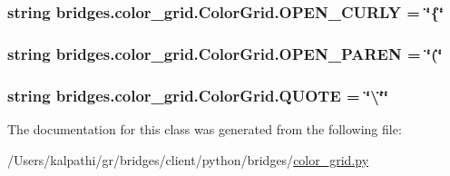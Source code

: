 \subsubsection[{O\+P\+E\+N\+\_\+\+C\+U\+R\+L\+Y}]{\setlength{\rightskip}{0pt plus 5cm}string bridges.\+color\+\_\+grid.\+Color\+Grid.\+O\+P\+E\+N\+\_\+\+C\+U\+R\+L\+Y = \char`\"{}\{\char`\"{}\hspace{0.3cm}{\ttfamily [static]}}\label{classbridges_1_1color__grid_1_1_color_grid_a72d74aa84fe5e8933077797f02c6f025}
\hypertarget{classbridges_1_1color__grid_1_1_color_grid_aa9cf473f9df8ec2e9b885d830cad1b11}{}
\subsubsection[{O\+P\+E\+N\+\_\+\+P\+A\+R\+E\+N}]{\setlength{\rightskip}{0pt plus 5cm}string bridges.\+color\+\_\+grid.\+Color\+Grid.\+O\+P\+E\+N\+\_\+\+P\+A\+R\+E\+N = \char`\"{}(\char`\"{}\hspace{0.3cm}{\ttfamily [static]}}\label{classbridges_1_1color__grid_1_1_color_grid_aa9cf473f9df8ec2e9b885d830cad1b11}
\hypertarget{classbridges_1_1color__grid_1_1_color_grid_aa04754ccd3208b64eb3ad7b13e4b0315}{}
\subsubsection[{Q\+U\+O\+T\+E}]{\setlength{\rightskip}{0pt plus 5cm}string bridges.\+color\+\_\+grid.\+Color\+Grid.\+Q\+U\+O\+T\+E = \char`\"{}\textbackslash{}\char`\"{}\char`\"{}\hspace{0.3cm}{\ttfamily [static]}}\label{classbridges_1_1color__grid_1_1_color_grid_aa04754ccd3208b64eb3ad7b13e4b0315}


The documentation for this class was generated from the following file\+:\begin{DoxyCompactItemize}
\item 
/\+Users/kalpathi/gr/bridges/client/python/bridges/\hyperlink{color__grid_8py}{color\+\_\+grid.\+py}\end{DoxyCompactItemize}
